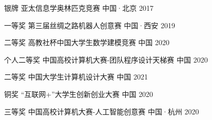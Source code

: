 



\begin{cvhonors}

  \cvhonor
    {银牌} %
    {亚太信息学奥林匹克竞赛} %
    {中国·北京} %
    {2017} %

\end{cvhonors}




\begin{cvhonors}

  \cvhonor
    {一等奖} %
    {第三届丝绸之路机器人创意赛} %
    {中国·西安} %
    {2019} %

  \cvhonor
    {二等奖} %
    {高教社杯中国大学生数学建模竞赛} %
    {中国} %
    {2020} %
    
    \cvhonor
    {个人二等奖} %
    {中国高校计算机大赛-团队程序设计天梯赛} %
    {中国} %
    {2020} %

    \cvhonor
    {二等奖} %
    {中国大学生计算机设计大赛} %
    {中国} %
    {2021} %


    \cvhonor
    {铜奖} %
    {“互联网+”大学生创新创业大赛} %
    {中国} %
    {2020} %

    \cvhonor
    {三等奖} %
    {中国高校计算机大赛-人工智能创意赛} %
    {中国·杭州} %
    {2020} %

\end{cvhonors}

